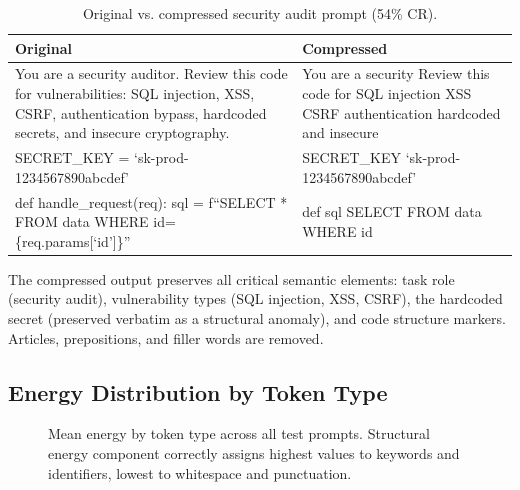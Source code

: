 \documentclass[11pt]{article}
\theoremstyle{remark}
\begin{document}
\begin{table}[H]
\centering
\caption{Original vs. compressed security audit prompt (54\% CR).}
\label{tab:qualitative}
\small
\begin{tabular}{p{}p{}}
\toprule
\textbf{Original} & \textbf{Compressed} \\
\midrule
You are a security auditor. Review this code for vulnerabilities: SQL injection, XSS, CSRF, authentication bypass, hardcoded secrets, and insecure cryptography. &
You are a security Review this code for SQL injection XSS CSRF authentication hardcoded and insecure \\
\addlinespace
SECRET\_KEY = `sk-prod-1234567890abcdef' & SECRET\_KEY `sk-prod-1234567890abcdef' \\
\addlinespace
def handle\_request(req): sql = f``SELECT * FROM data WHERE id=\{req.params[`id']\}'' & def sql SELECT FROM data WHERE id \\
\bottomrule
\end{tabular}
\end{table}

The compressed output preserves all critical semantic elements: task role
(security audit), vulnerability types (SQL injection, XSS, CSRF), the
hardcoded secret (preserved verbatim as a structural anomaly), and code
structure markers. Articles, prepositions, and filler words are removed.

\subsection{Energy Distribution by Token Type}

\begin{figure}[H]
\centering
{}
\caption{Mean energy by token type across all test prompts. Structural energy
component correctly assigns highest values to keywords and identifiers, lowest
to whitespace and punctuation.}
\label{fig:energy-by-type}
\end{figure}
\end{document}
